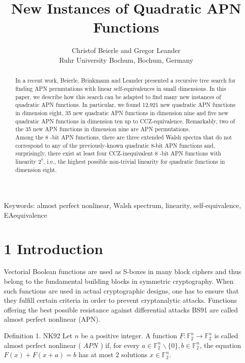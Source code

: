 \documentclass[10pt]{article}
\title{New Instances of Quadratic APN Functions }
\author{Christof Beierle and Gregor Leander\\
Ruhr University Bochum, Bochum, Germany}
\date{}
\begin{document}
\maketitle
\captionsetup{singlelinecheck=false}


\begin{abstract}
In a recent work, Beierle, Brinkmann and Leander presented a recursive tree search for finding APN permutations with linear self-equivalences in small dimensions. In this paper, we describe how this search can be adapted to find many new instances of quadratic APN functions. In particular, we found 12,921 new quadratic APN functions in dimension eight, 35 new quadratic APN functions in dimension nine and five new quadratic APN functions in dimension ten up to CCZ-equivalence. Remarkably, two of the 35 new APN functions in dimension nine are APN permutations.\\
Among the 8 -bit APN functions, there are three extended Walsh spectra that do not correspond to any of the previously-known quadratic 8-bit APN functions and, surprisingly, there exist at least four CCZ-inequivalent 8 -bit APN functions with linearity $2^{7}$, i.e., the highest possible non-trivial linearity for quadratic functions in dimension eight.
\end{abstract}

Keywords: almost perfect nonlinear, Walsh spectrum, linearity, self-equivalence, EAequivalence

\section*{1 Introduction}
Vectorial Boolean functions are used as S-boxes in many block ciphers and thus belong to the fundamental building blocks in symmetric cryptography. When such functions are used in actual cryptographic designs, one has to ensure that they fulfill certain criteria in order to prevent cryptanalytic attacks. Functions offering the best possible resistance against differential attacks BS91 are called almost perfect nonlinear (APN).

Definition 1. NK92 Let $n$ be a positive integer. A function $F: \mathbb{F}_{2}^{n} \rightarrow \mathbb{F}_{2}^{n}$ is called almost perfect nonlinear ( $A P N$ ) if, for every $a \in \mathbb{F}_{2}^{n} \backslash\{0\}, b \in \mathbb{F}_{2}^{n}$, the equation $F(x)+F(x+a)=b$ has at most 2 solutions $x \in \mathbb{F}_{2}^{n}$.
\end{document}
